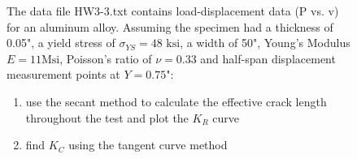 \documentclass[12pt, oneside]{article}
\begin{document}
\begin{enumerate}
\begin{figure}[H]
	\item The data file HW3-3.txt contains load-displacement data (P vs. v) for an aluminum alloy. Assuming the specimen had a thickness of 0.05", a yield stress of $\sigma_{YS} = 48 \text{ ksi}$, a width of 50", Young's Modulus $E = 11 \text{Msi}$, Poisson's ratio of $\nu = 0.33$ and half-span displacement measurement points at $Y = 0.75$":
	\begin{enumerate}
		\item use the secant method to calculate the effective crack length throughout the test and plot the $K_R$ curve
		\item find $K_C$ using the tangent curve method
	\end{enumerate} 
\end{figure}

\end{enumerate}
\end{document}
